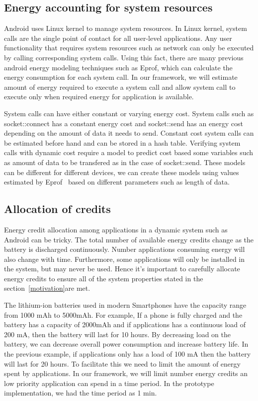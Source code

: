 \subsection{Energy accounting for system resources }

Android uses Linux kernel to manage system resources. In Linux kernel, system calls are the single point of contact for all user-level applications. Any user functionality that requires system resources such as network can only be executed by calling corresponding system calls. Using this fact, there are many previous android energy modeling techniques such as Eprof, which can calculate the energy consumption for each system call. In our framework, we will estimate amount of energy required to execute a system call and allow system call to execute only when required energy for application is available.

System calls can have either constant or varying energy cost. System calls such as socket::connect has a constant energy cost and socket::send has an energy cost depending on the amount of data it needs to send. Constant cost system calls can be estimated before hand and can be stored in a hash table. Verifying system calls with dynamic cost require a model to predict cost based some variables such as amount of data to be transfered as in the case of socket::send. These models can be different for different devices, we can create these models using values estimated by Eprof~\cite{pathak2012energy} based on different parameters such as length of data.

\subsection{ Allocation of credits }

Energy credit allocation among applications in a dynamic system such as Android can be tricky. The total number of available energy credits change as the battery is discharged continuously. Number applications consuming energy will also change with time. Furthermore, some applications will only be installed in the system, but may never be used. Hence it's important to carefully allocate energy credits to ensure all of the system properties stated in the section~\ref{motivation}are met.

The lithium-ion batteries used in modern Smartphones have the capacity range from 1000 mAh to 5000mAh. For example, If a phone is fully charged and the battery has a capacity of 2000mAh and if applications has a continuous load of 200 mA, then the battery will last for 10 hours. By decreasing load on the battery, we can decrease overall power consumption and increase battery life. In the previous example, if applications only has a load of 100 mA then the battery will last for 20 hours. To facilitate this we need to limit the amount of energy spent by applications. In our framework, we will limit number energy credits an low priority application can spend in a time period. In the prototype implementation, we had the time period as 1 min.

